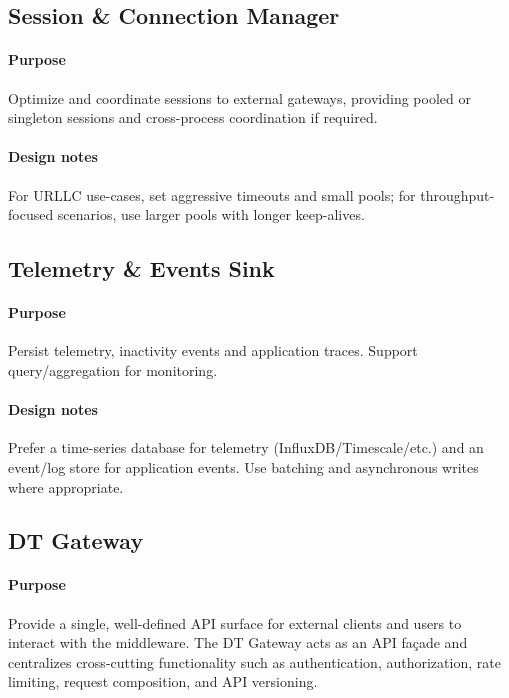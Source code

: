\documentclass[11pt,a4paper]{article}
\begin{document}
\subsection{Session \& Connection Manager}
\paragraph{Purpose}
Optimize and coordinate sessions to external gateways, providing pooled or singleton sessions and cross-process coordination if required.

\paragraph{Design notes}
For URLLC use-cases, set aggressive timeouts and small pools; for throughput-focused scenarios, use larger pools with longer keep-alives.

\subsection{Telemetry \& Events Sink}
\paragraph{Purpose}
Persist telemetry, inactivity events and application traces. Support query/aggregation for monitoring.

\paragraph{Design notes}
Prefer a time-series database for telemetry (InfluxDB/Timescale/etc.) and an event/log store for application events. Use batching and asynchronous writes where appropriate.

\subsection{DT Gateway}
\paragraph{Purpose}
Provide a single, well-defined API surface for external clients and users to interact with the middleware. The DT Gateway acts as an API façade and centralizes cross-cutting functionality such as authentication, authorization, rate limiting, request composition, and API versioning.
\end{document}
